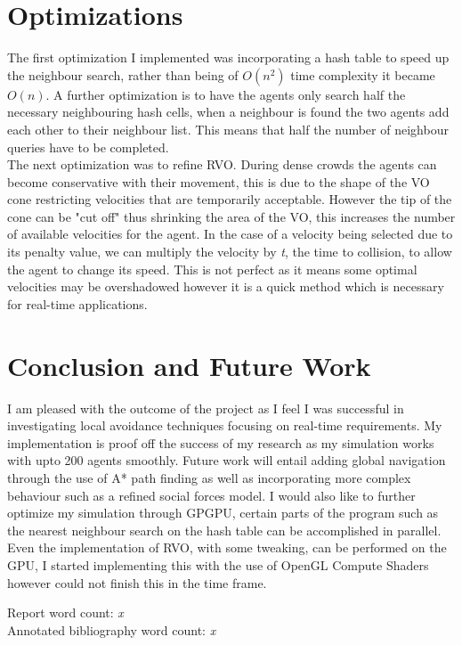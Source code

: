 \documentclass[a4paper,twocolumn]{article}
\begin{document}
\section{Optimizations}
The first optimization I implemented was incorporating a hash table to speed up the neighbour search, rather than being of $O(n^{2})$ time complexity it became $O(n)$. A further optimization is to have the agents only search half the necessary neighbouring hash cells, when a neighbour is found the two agents add each other to their neighbour list. This means that half the number of neighbour queries have to be completed.\\
The next optimization was to refine RVO. During dense crowds the agents can become conservative with their movement, this is due to the shape of the VO cone restricting velocities that are temporarily acceptable. However the tip of the cone can be "cut off" thus shrinking the area of the VO\cite{AGuy2009CP}, this increases the number of available velocities for the agent. In the case of a velocity being selected due to its penalty value, we can multiply the velocity by \emph{t}, the time to collision, to allow the agent to change its speed. This is not perfect as it means some optimal velocities may be overshadowed however it is a quick method which is necessary for real-time applications.\\

\section{Conclusion and Future Work}
I am pleased with the outcome of the project as I feel I was successful in investigating local avoidance techniques focusing on real-time requirements. My implementation is proof off the success of my research as my simulation works with upto 200 agents smoothly. Future work will entail adding global navigation through the use of A* path finding as well as incorporating more complex behaviour such as a refined social forces model. I would also like to further optimize my simulation through GPGPU, certain parts of the program such as the nearest neighbour search on the hash table can be accomplished in parallel\cite{GGHT}. Even the implementation of RVO, with some tweaking, can be performed on the GPU, I started implementing this with the use of OpenGL Compute Shaders however could not finish this in the time frame.\\

\newpage
%




Report word count: \emph{x}\\
Annotated bibliography word count: \emph{x}
\end{document}
